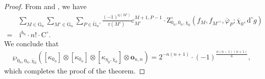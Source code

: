 \documentclass[12pt, a4paper]{amsart}
\newcommand{\RG}{{\mathrm {G}}}
\newcommand{\RZ}{{\mathrm {Z}}}
\theoremstyle{Theorem}
\theoremstyle{Theorem}
\theoremstyle{Theorem}
\theoremstyle{Theorem}
\theoremstyle{Plain}
\theoremstyle{Definition}
\begin{document}
\begin{proof}
		From \cite[Corollary 2.16]{IM} and \cite[Lemma 2.14]{HMN}, we have
		\[
		\begin{aligned}
			&\sum_{M\in\RG_n}\sum_{M'\in\RG_n}\sum_{P\in\check{\RG}_n'}\frac{(-1)^{\mathrm{q}(M')}}{\mathrm{r}(M')}\mathrm{c}_{M'}^{M+1,P-1}\cdot\RZ^{\circ}_{0_n,0_n,\overline{\chi}_0}\left(f_M,f_{M'^{\vee}},\overline{\varphi}_P;\overline{\chi}_0,\mathrm{d}^{\circ}g\right)\\
			=& \,\mathrm{i}^{b_n}\cdot n!\cdot\mathrm{C}^{\circ}.
		\end{aligned}
		\]
		We conclude that
		\[
		\begin{aligned}
			\wp_{0_n,0_n,\overline{\chi}_0}\left([\kappa_{0_n}]\otimes[\kappa_{0_n}]\otimes[\kappa_{\eta_0,\overline{\chi}_0}]\otimes\mathbf{o}_{n,n}\right)=2^{-n(n+1)}\cdot (-1)^{\frac{n(n-1)(n+1)}{6}},
		\end{aligned}
		\]
		which completes the proof of the theorem.
	\end{proof}
	
	
	
\end{document}
